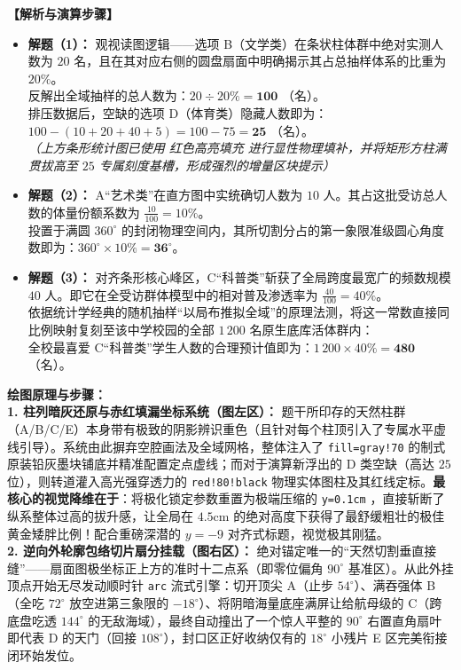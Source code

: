 \documentclass[12pt, a4paper]{ctexrep}
\begin{document}
\vspace{0.4cm}
\textbf{【解析与演算步骤】}
\begin{itemize}
    \item \textbf{解题（1）：} 观视读图逻辑——选项 B（文学类）在条状柱体群中绝对实测人数为 $20$ 名，且在其对应右侧的圆盘扇面中明确揭示其占总抽样体系的比重为 $20\%$。\\
    反解出全域抽样的总人数为：$20 \div 20\% = \mathbf{100}$ （名）。\\
    排压数据后，空缺的选项 D（体育类）隐藏人数即为：$100 - (10 + 20 + 40 + 5) = 100 - 75 = \mathbf{25}$ （名）。\\
    \textit{（上方条形统计图已使用 \textcolor{red!80!black}{红色高亮填充} 进行显性物理填补，并将矩形方柱满贯拔高至 $25$ 专属刻度基槽，形成强烈的增量区块提示）}
    \item \textbf{解题（2）：} A“艺术类”在直方图中实统确切人数为 $10$ 人。其占这批受访总人数的体量份额系数为 $\frac{10}{100} = 10\%$。\\
    投置于满圆 $360^\circ$ 的封闭物理空间内，其所切割分占的第一象限准级圆心角度数即为：$360^\circ \times 10\% = \mathbf{36^\circ}$。
    \item \textbf{解题（3）：} 对齐条形核心峰区，C“科普类”斩获了全局跨度最宽广的频数规模 $40$ 人。即它在全受访群体模型中的相对普及渗透率为 $\frac{40}{100} = 40\%$。\\
    依据统计学经典的随机抽样“以局布推拟全域”的原理法测，将这一常数直接同比例映射复刻至该中学校园的全部 $1\,200$ 名原生底库活体群内：\\
    全校最喜爱 C“科普类”学生人数的合理预计值即为：$1\,200 \times 40\% = \mathbf{480}$ （名）。
\end{itemize}

\vspace{0.4cm}
{\small\color{blue!70!black}
\textbf{绘图原理与步骤：}\\
\textbf{1. 柱列暗灰还原与赤红填漏坐标系统（图左区）：} 题干所印存的天然柱群（A/B/C/E）本身带有极致的阴影辨识重色（且针对每个柱顶引入了专属水平虚线引导）。系统由此摒弃空腔画法及全域网格，整体注入了 \texttt{fill=gray!70} 的制式原装铅灰墨块铺底并精准配置定点虚线；而对于演算新浮出的 D 类空缺（高达 $25$ 位），则转道灌入高光强穿透力的 \texttt{red!80!black} 物理实体图柱及其红线定标。\textbf{最核心的视觉降维在于}：将极化锁定参数重置为极端压缩的 \texttt{y=0.1cm} ，直接斩断了纵系整体过高的拔升感，让全局在 $4.5\mathrm{cm}$ 的绝对高度下获得了最舒缓粗壮的极佳黄金矮胖比例！配合重磅深潜的 $y=-9$ 对齐式标题，视觉极其刚猛。\\
\textbf{2. 逆向外轮廓包络切片扇分挂载（图右区）：} 绝对锚定唯一的“天然切割垂直接缝”——扇面图极坐标正上方的准时十二点系（即零位偏角 $90^\circ$ 基准区）。从此外挂顶点开始无尽发动顺时针 \texttt{arc} 流式引擎：切开顶尖 A（止步 $54^\circ$）、满吞强体 B（全吃 $72^\circ$ 放空进第三象限的 $-18^\circ$）、将阴暗海量底座满屏让给航母级的 C（跨底盘吃透 $144^\circ$ 的无敌海域），最终自动撞出了一个惊人平整的 $90^\circ$ 右置直角扇叶即代表 D 的天门（回接 $108^\circ$），封口区正好收纳仅有的 $18^\circ$ 小残片 E 区完美衔接闭环始发位。
}
\end{document}
